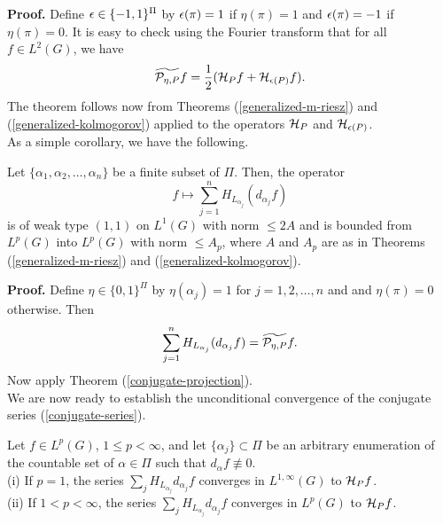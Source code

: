 {\bf Proof.}  Define $\epsilon \in \{-1,1\}^\Pi$ by 
$\epsilon (\pi)=1 $ if $\eta (\pi) =1$ and 
$\epsilon (\pi)=-1 $ if $\eta (\pi) =0$.  It is easy
to check using the Fourier transform that
for all $f\in L^2(G)$, we have
$$\widetilde{{\cal P}_{\eta, P}}f=
\frac{1}{2}({\cal H}_P f + {\cal H}_{\epsilon(P)} f).$$
The theorem follows now from 
Theorems (\ref{generalized-m-riesz}) and 
(\ref{generalized-kolmogorov}) applied to the 
operators ${\cal H}_P$ and ${\cal H}_{\epsilon(P)}$.\\

As a simple corollary, we have the following.
\begin{finite-conjugate-projection}
Let $\{\alpha_1,\alpha_2,\ldots,\alpha_n\}$
be a finite subset of $\Pi$.
Then, the operator
$$f\mapsto \sum_{j=1}^n H_{L_{\alpha_j}} (d_{\alpha_j} f)$$
is of weak type $(1,1)$ 
on $L^1(G)$ with norm $\leq 2 A$ and is bounded from
$L^p(G)$ into $L^p(G)$ with
norm $\leq A_p$, where $A$ and $A_p$
are as in Theorems (\ref{generalized-m-riesz}) and 
(\ref{generalized-kolmogorov}).
\label{finite-conjugate-projection}
\end{finite-conjugate-projection}
{\bf Proof.}  Define $\eta\in \{0,1\}^\Pi$
by $\eta(\alpha_j)=1$ for $j=1,2,\ldots,n$ and 
and $\eta (\pi)=0$ otherwise.  Then
\begin{equation}
\sum_{j=1}^n H_{L_{\alpha_j}} (d_{\alpha_j} f)=
\widetilde{{\cal P}_{\eta, P}}f.
\label{conjugate-eta-projection}
\end{equation}
Now apply Theorem (\ref{conjugate-projection}).\\
We are now ready to establish the unconditional
convergence of the conjugate series 
(\ref{conjugate-series}).
\begin{unconditional-convergence}
Let $f\in L^p(G)$, $1\leq p<\infty$, and let
$\{\alpha_j\}\subset \Pi$ be an arbitrary enumeration
of the countable set of $\alpha\in \Pi$ such that
$d_\alpha f\not\equiv 0$.\\
(i)  If $p=1$, the series 
$\sum_j H_{L_{\alpha_j}}
d_{\alpha_j}f$ 
converges in $L^{1,\infty} (G)$ to ${\cal H}_P f$.\\
(ii) If $1<p<\infty$, the series 
$\sum_jH_{L_{\alpha_j}}
d_{\alpha_j}f$ 
converges in $L^p (G)$ to ${\cal H}_P f$.
\label{unconditional-convergence}
\end{unconditional-convergence}
